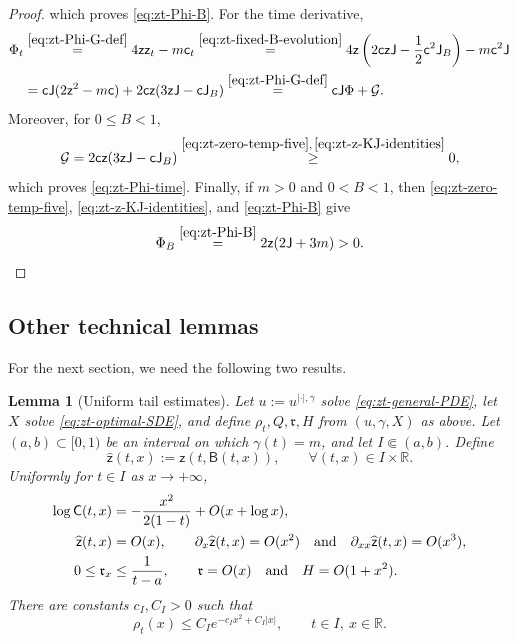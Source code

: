\documentclass[10pt]{amsart}
\newtheorem{lemma}[lemma]{Lemma}
\theoremstyle{definition}
\theoremstyle{remark}
\numberwithin{equation}{section}
\newcommand{\R}{\mathbb R}
\newcommand{\1}{\mathbf 1}
\newcommand{\cG}{\mathcal G}
\newcommand{\stackref}[2]{\stackrel{#2}{#1}}
\begin{document}
\begin{proof}
which proves \eqref{eq:zt-Phi-B}. For the time derivative,
\begin{align*}
 \Phi_t
 &\stackref{=}{\eqref{eq:zt-Phi-G-def}}
 4\mathsf z\mathsf z_t-m\mathsf c_t\stackref{=}{\eqref{eq:zt-fixed-B-evolution}}
 4\mathsf z\left(2\mathsf c\mathsf z\mathsf J-\frac12\mathsf c^2\mathsf J_B\right)-m\mathsf c^2\mathsf J\\
 &=\mathsf c\mathsf J(2\mathsf z^2-m\mathsf c)+2\mathsf c\mathsf z(3\mathsf z\mathsf J-\mathsf c\mathsf J_B)
 \stackref{=}{\eqref{eq:zt-Phi-G-def}}
 \mathsf c\mathsf J\Phi+\cG.
\end{align*}
Moreover, for $0\leq B<1$,
\begin{equation*}
 \cG=2\mathsf c\mathsf z(3\mathsf z\mathsf J-\mathsf c\mathsf J_B)
 \stackref{\geq}{\eqref{eq:zt-zero-temp-five},\,\eqref{eq:zt-z-KJ-identities}}0,
\end{equation*}
which proves \eqref{eq:zt-Phi-time}. Finally, if $m>0$ and $0<B<1$, then \eqref{eq:zt-zero-temp-five}, \eqref{eq:zt-z-KJ-identities}, and \eqref{eq:zt-Phi-B} give
\begin{equation*}
 \Phi_B
 \stackref{=}{\eqref{eq:zt-Phi-B}}
 2\mathsf z(2\mathsf J+3m)>0.
\end{equation*}
\end{proof}

\subsection{Other technical lemmas}
\label{sec:zt-tails}

For the next section, we need the following two results.

\begin{lemma}[Uniform tail estimates]
\label{lem:zt-tails}
Let $u:=u^{|\cdot|,\gamma}$ solve \eqref{eq:zt-general-PDE}, let $X$ solve \eqref{eq:zt-optimal-SDE}, and define $\rho_t,Q,\mathfrak r,H$ from $(u,\gamma,X)$ as above. Let $(a,b)\subset[0,1)$ be an interval on which $\gamma(t)=m$, and let $I\Subset(a,b)$. Define
\begin{equation*}
 \widehat{\mathsf z}(t,x):=\mathsf z(t,\mathsf B(t,x)),
 \qquad \forall (t,x)\in I\times\R.
\end{equation*}
Uniformly for $t\in I$ as $x\to+\infty$,
\begin{align}
 \log\mathsf C(t,x)&=-\frac{x^2}{2(1-t)}+O(x+\log x),                  \label{eq:zt-C-Gaussian-tail}\\
 \widehat{\mathsf z}(t,x)&=O(x),\qquad \partial_x\widehat{\mathsf z}(t,x)=O(x^2)\quad\text{and}\quad \partial_{xx}\widehat{\mathsf z}(t,x)=O(x^3),\notag\\
 0\leq\mathfrak r_x&\leq\frac1{t-a},\qquad
 \mathfrak r=O(x)\quad\text{and}\quad H=O(1+x^2).             \label{eq:zt-score-tail}
\end{align}
There are constants $c_I,C_I>0$ such that
\begin{equation}
 \rho_t(x)\leq C_Ie^{-c_Ix^2+C_I|x|},
 \qquad t\in I,\ x\in\R.
 \label{eq:zt-rho-Gaussian-tail}
\end{equation}
\end{lemma}
\end{document}

